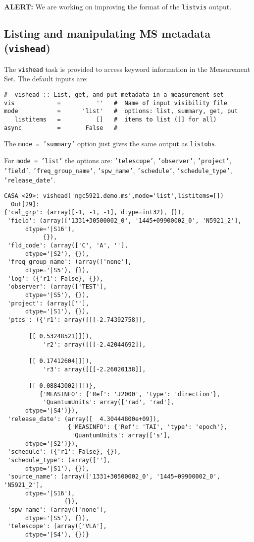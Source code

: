 {\bf ALERT:} We are working on improving the format of the {\tt listvis} output.

\subsection{Listing and manipulating MS metadata ({\tt vishead})}
\label{section:io.vis.vishead}

The {\tt vishead} task is provided to access keyword information in
the Measurement Set.  The default inputs are:
\small
\begin{verbatim}
#  vishead :: List, get, and put metadata in a measurement set
vis            =          ''   #  Name of input visibility file
mode           =      'list'   #  options: list, summary, get, put
   listitems   =          []   #  items to list ([] for all)
async          =       False   #  
\end{verbatim}
\normalsize

The {\tt mode = 'summary'} option just gives the same output as
{\tt listobs}.

For {\tt mode = 'list'} the options are: {\tt 'telescope'}, 
{\tt 'observer'}, {\tt 'project'}, {\tt 'field'}, {\tt 'freq\_group\_name'},
{\tt 'spw\_name'}, {\tt 'schedule'}, {\tt 'schedule\_type'}, 
{\tt 'release\_date'}. 

\small
\begin{verbatim}
CASA <29>: vishead('ngc5921.demo.ms',mode='list',listitems=[])
  Out[29]: 
{'cal_grp': (array([-1, -1, -1], dtype=int32), {}),
 'field': (array(['1331+30500002_0', '1445+09900002_0', 'N5921_2'], 
      dtype='|S16'),
           {}),
 'fld_code': (array(['C', 'A', ''], 
      dtype='|S2'), {}),
 'freq_group_name': (array(['none'], 
      dtype='|S5'), {}),
 'log': ({'r1': False}, {}),
 'observer': (array(['TEST'], 
      dtype='|S5'), {}),
 'project': (array([''], 
      dtype='|S1'), {}),
 'ptcs': ({'r1': array([[[-2.74392758]],

       [[ 0.53248521]]]),
           'r2': array([[[-2.42044692]],

       [[ 0.17412604]]]),
           'r3': array([[[-2.26020138]],

       [[ 0.08843002]]])},
          {'MEASINFO': {'Ref': 'J2000', 'type': 'direction'},
           'QuantumUnits': array(['rad', 'rad'], 
      dtype='|S4')}),
 'release_date': (array([  4.30444800e+09]),
                  {'MEASINFO': {'Ref': 'TAI', 'type': 'epoch'},
                   'QuantumUnits': array(['s'], 
      dtype='|S2')}),
 'schedule': ({'r1': False}, {}),
 'schedule_type': (array([''], 
      dtype='|S1'), {}),
 'source_name': (array(['1331+30500002_0', '1445+09900002_0', 'N5921_2'], 
      dtype='|S16'),
                 {}),
 'spw_name': (array(['none'], 
      dtype='|S5'), {}),
 'telescope': (array(['VLA'], 
      dtype='|S4'), {})}
\end{verbatim}
\normalsize

